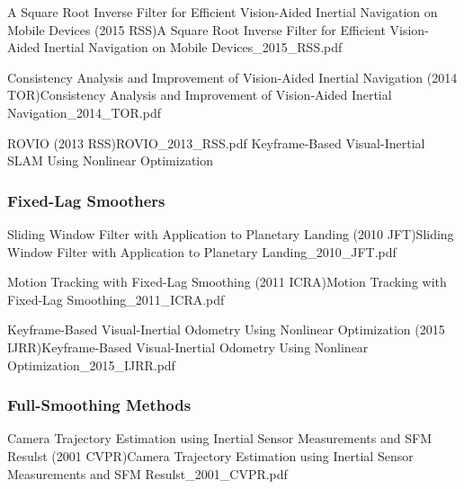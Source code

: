 \documentclass[10pt,a4paper]{scrartcl}
\begin{document}
\begin{multicols*}{2}
\begin{Paper}{A Square Root Inverse Filter for Efficient Vision-Aided Inertial Navigation on Mobile Devices (2015 RSS)}{A Square Root Inverse Filter for Efficient Vision-Aided Inertial Navigation on Mobile Devices_2015_RSS.pdf}
\end{Paper}

\begin{Paper}{Consistency Analysis and Improvement of Vision-Aided Inertial Navigation (2014 TOR)}{Consistency Analysis and Improvement of Vision-Aided Inertial Navigation_2014_TOR.pdf}
\end{Paper}

\begin{Paper}{ROVIO (2013 RSS)}{ROVIO_2013_RSS.pdf}
Keyframe-Based Visual-Inertial SLAM Using Nonlinear Optimization
\end{Paper}

\subsubsection{Fixed-Lag Smoothers}

\begin{Paper}{Sliding Window Filter with Application to Planetary Landing (2010 JFT)}{Sliding Window Filter with Application to Planetary Landing_2010_JFT.pdf}
\end{Paper}

\begin{Paper}{Motion Tracking with Fixed-Lag Smoothing (2011 ICRA)}{Motion Tracking with Fixed-Lag Smoothing_2011_ICRA.pdf}
\end{Paper}

\begin{Paper}{Keyframe-Based Visual-Inertial Odometry Using Nonlinear Optimization (2015 IJRR)}{Keyframe-Based Visual-Inertial Odometry Using Nonlinear Optimization_2015_IJRR.pdf}
\end{Paper}

\subsubsection{Full-Smoothing Methods}

\begin{Paper}{Camera Trajectory Estimation using Inertial Sensor Measurements and SFM Resulst (2001 CVPR)}{Camera Trajectory Estimation using Inertial Sensor Measurements and SFM Resulst_2001_CVPR.pdf}
\end{Paper}


\end{multicols*}
\end{document}
